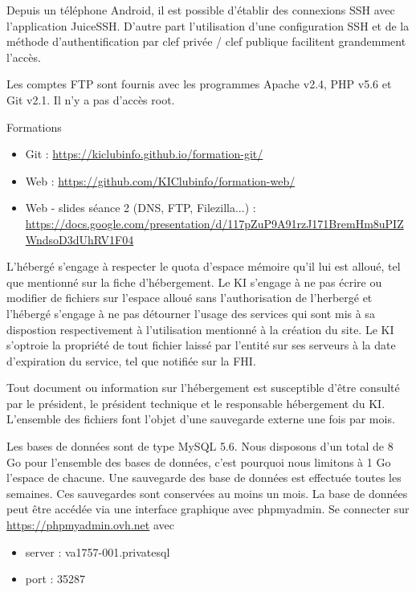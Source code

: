 \documentclass{ki019}
\begin{document}
Depuis un téléphone Android, il est possible d'établir des connexions SSH avec l'application JuiceSSH. D'autre part l'utilisation d'une configuration SSH et de la méthode d'authentification par clef privée / clef publique facilitent grandemment l'accès.

Les comptes FTP sont fournis avec les programmes Apache v2.4, PHP v5.6 et Git v2.1. Il n'y a pas d'accès root.

Formations
\begin{itemize}
\item Git : \url{https://kiclubinfo.github.io/formation-git/}
\item Web : \url{https://github.com/KIClubinfo/formation-web/}
\item Web - slides séance 2 (DNS, FTP, Filezilla...) : \\
\url{https://docs.google.com/presentation/d/117pZuP9A91rzJ171BremHm8uPIZWndsoD3dUhRV1F04}
\end{itemize}


L'hébergé s'engage à respecter le quota d'espace mémoire qu'il lui est alloué, tel que mentionné sur la fiche d'hébergement.
Le KI s'engage à ne pas écrire ou modifier de fichiers sur l'espace alloué sans l'authorisation de l'herbergé et l'hébergé s'engage à ne pas détourner l'usage des services qui sont mis à sa dispostion respectivement à l'utilisation mentionné à la création du site.
Le KI s'optroie la propriété de tout fichier laissé par l'entité sur ses serveurs à la date d'expiration du service, tel que notifiée sur la FHI.


Tout document ou information sur l'hébergement est susceptible d'être consulté par le président, le président technique et le responsable hébergement du KI.
L'ensemble des fichiers font l'objet d'une sauvegarde externe une fois par mois.



Les bases de données sont de type MySQL 5.6. Nous disposons d'un total de 8 Go pour l'ensemble des bases de données, c'est pourquoi nous limitons à 1 Go l'espace de chacune.
Une sauvegarde des base de données est effectuée toutes les semaines. Ces sauvegardes sont conservées au moins un mois.
La base de données peut être accédée via une interface graphique avec phpmyadmin.
Se connecter sur \url{https://phpmyadmin.ovh.net} avec
\begin{itemize}
\item server : va1757-001.privatesql
\item port : 35287
\end{itemize}
\end{document}
